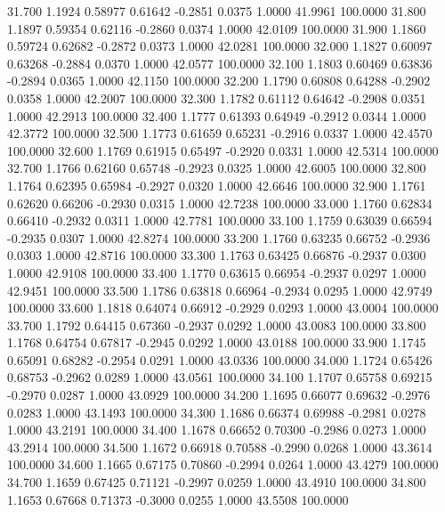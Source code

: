   31.700   1.1924   0.58977   0.61642  -0.2851   0.0375   1.0000  41.9961 100.0000
  31.800   1.1897   0.59354   0.62116  -0.2860   0.0374   1.0000  42.0109 100.0000
  31.900   1.1860   0.59724   0.62682  -0.2872   0.0373   1.0000  42.0281 100.0000
  32.000   1.1827   0.60097   0.63268  -0.2884   0.0370   1.0000  42.0577 100.0000
  32.100   1.1803   0.60469   0.63836  -0.2894   0.0365   1.0000  42.1150 100.0000
  32.200   1.1790   0.60808   0.64288  -0.2902   0.0358   1.0000  42.2007 100.0000
  32.300   1.1782   0.61112   0.64642  -0.2908   0.0351   1.0000  42.2913 100.0000
  32.400   1.1777   0.61393   0.64949  -0.2912   0.0344   1.0000  42.3772 100.0000
  32.500   1.1773   0.61659   0.65231  -0.2916   0.0337   1.0000  42.4570 100.0000
  32.600   1.1769   0.61915   0.65497  -0.2920   0.0331   1.0000  42.5314 100.0000
  32.700   1.1766   0.62160   0.65748  -0.2923   0.0325   1.0000  42.6005 100.0000
  32.800   1.1764   0.62395   0.65984  -0.2927   0.0320   1.0000  42.6646 100.0000
  32.900   1.1761   0.62620   0.66206  -0.2930   0.0315   1.0000  42.7238 100.0000
  33.000   1.1760   0.62834   0.66410  -0.2932   0.0311   1.0000  42.7781 100.0000
  33.100   1.1759   0.63039   0.66594  -0.2935   0.0307   1.0000  42.8274 100.0000
  33.200   1.1760   0.63235   0.66752  -0.2936   0.0303   1.0000  42.8716 100.0000
  33.300   1.1763   0.63425   0.66876  -0.2937   0.0300   1.0000  42.9108 100.0000
  33.400   1.1770   0.63615   0.66954  -0.2937   0.0297   1.0000  42.9451 100.0000
  33.500   1.1786   0.63818   0.66964  -0.2934   0.0295   1.0000  42.9749 100.0000
  33.600   1.1818   0.64074   0.66912  -0.2929   0.0293   1.0000  43.0004 100.0000
  33.700   1.1792   0.64415   0.67360  -0.2937   0.0292   1.0000  43.0083 100.0000
  33.800   1.1768   0.64754   0.67817  -0.2945   0.0292   1.0000  43.0188 100.0000
  33.900   1.1745   0.65091   0.68282  -0.2954   0.0291   1.0000  43.0336 100.0000
  34.000   1.1724   0.65426   0.68753  -0.2962   0.0289   1.0000  43.0561 100.0000
  34.100   1.1707   0.65758   0.69215  -0.2970   0.0287   1.0000  43.0929 100.0000
  34.200   1.1695   0.66077   0.69632  -0.2976   0.0283   1.0000  43.1493 100.0000
  34.300   1.1686   0.66374   0.69988  -0.2981   0.0278   1.0000  43.2191 100.0000
  34.400   1.1678   0.66652   0.70300  -0.2986   0.0273   1.0000  43.2914 100.0000
  34.500   1.1672   0.66918   0.70588  -0.2990   0.0268   1.0000  43.3614 100.0000
  34.600   1.1665   0.67175   0.70860  -0.2994   0.0264   1.0000  43.4279 100.0000
  34.700   1.1659   0.67425   0.71121  -0.2997   0.0259   1.0000  43.4910 100.0000
  34.800   1.1653   0.67668   0.71373  -0.3000   0.0255   1.0000  43.5508 100.0000
